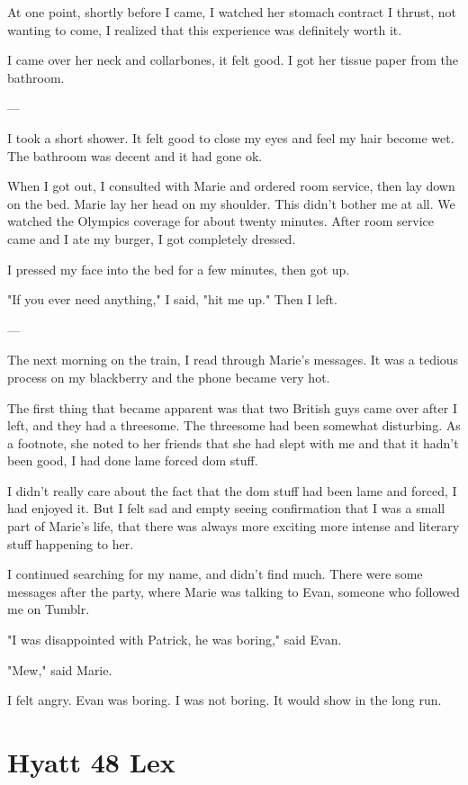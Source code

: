 \documentclass[12pt]{article}
\begin{document}
At one point, shortly before I came, I watched her stomach contract I thrust,
not wanting to come, I realized that this experience was definitely worth it.

I came over her neck and collarbones, it felt good.  I got her tissue paper from
the bathroom.

---

I took a short shower.  It felt good to close my eyes and feel my hair become
wet.  The bathroom was decent and it had gone ok.

When I got out, I consulted with Marie and ordered room service, then lay down
on the bed.  Marie lay her head on my shoulder.  This didn't bother me at all.
We watched the Olympics coverage for about twenty minutes.  After room service
came and I ate my burger, I got completely dressed.  

I pressed my face into the bed for a few minutes, then got up.

"If you ever need anything," I said, "hit me up."  Then I left.

---

The next morning on the train, I read through Marie's messages.  It was a
tedious process on my blackberry and the phone became very hot. 

The first thing that became apparent was that two British guys came over
after I left, and they had a threesome.  The threesome had been somewhat
disturbing.  As a footnote, she noted to her friends that she had slept with me
and that it hadn't been good, I had done lame forced dom stuff.

I didn't really care about the fact that the dom stuff had been lame and forced,
I had enjoyed it.  But I felt sad and empty seeing confirmation that I was a small part of
Marie's life, that there was always more exciting more intense and literary
stuff happening to her.

I continued searching for my name, and didn't find much.  There were some
messages after the party, where Marie was talking to Evan, someone who followed
me on Tumblr.

"I was disappointed with Patrick, he was boring," said Evan.

"Mew," said Marie.

I felt angry.  Evan was boring.  I was not boring.  It would show in the long
run. 
            
\section{Hyatt 48 Lex}
\end{document}
